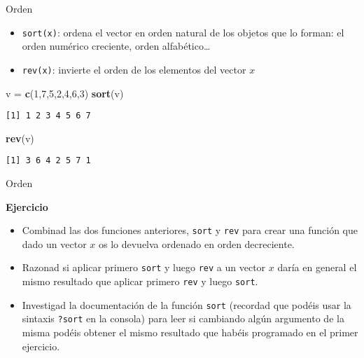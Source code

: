 \documentclass[
  ignorenonframetext,
]{beamer}
\newenvironment{Shaded}{\begin{snugshade}}{\end{snugshade}}
\newcommand{\DecValTok}[1]{\textcolor[rgb]{0.00,0.00,0.81}{#1}}
\newcommand{\KeywordTok}[1]{\textcolor[rgb]{0.13,0.29,0.53}{\textbf{#1}}}
\newcommand{\NormalTok}[1]{#1}
\newcommand{\StringTok}[1]{\textcolor[rgb]{0.31,0.60,0.02}{#1}}
\providecommand{\tightlist}{%
  \setlength{\itemsep}{0pt}\setlength{\parskip}{0pt}}
\begin{document}
\begin{frame}[fragile]{Orden}
\protect\hypertarget{orden}{}

\begin{itemize}
\tightlist
\item
  \texttt{sort(x)}: ordena el vector en orden natural de los objetos que
  lo forman: el orden numérico creciente, orden alfabético\ldots{}
\item
  \texttt{rev(x)}: invierte el orden de los elementos del vector \(x\)
\end{itemize}

\begin{Shaded}
\begin{Highlighting}[]
\NormalTok{v =}\StringTok{ }\KeywordTok{c}\NormalTok{(}\DecValTok{1}\NormalTok{,}\DecValTok{7}\NormalTok{,}\DecValTok{5}\NormalTok{,}\DecValTok{2}\NormalTok{,}\DecValTok{4}\NormalTok{,}\DecValTok{6}\NormalTok{,}\DecValTok{3}\NormalTok{)}
\KeywordTok{sort}\NormalTok{(v)}
\end{Highlighting}
\end{Shaded}

\begin{verbatim}
[1] 1 2 3 4 5 6 7
\end{verbatim}

\begin{Shaded}
\begin{Highlighting}[]
\KeywordTok{rev}\NormalTok{(v)}
\end{Highlighting}
\end{Shaded}

\begin{verbatim}
[1] 3 6 4 2 5 7 1
\end{verbatim}

\end{frame}

\begin{frame}[fragile]{Orden}
\protect\hypertarget{orden-1}{}

\textbf{Ejercicio}

\begin{itemize}
\item
  Combinad las dos funciones anteriores, \texttt{sort} y \texttt{rev}
  para crear una función que dado un vector \(x\) os lo devuelva
  ordenado en orden decreciente.
\item
  Razonad si aplicar primero \texttt{sort} y luego \texttt{rev} a un
  vector \(x\) daría en general el mismo resultado que aplicar primero
  \texttt{rev} y luego \texttt{sort}.
\item
  Investigad la documentación de la función \texttt{sort} (recordad que
  podéis usar la sintaxis \texttt{?sort} en la consola) para leer si
  cambiando algún argumento de la misma podéis obtener el mismo
  resultado que habéis programado en el primer ejercicio.
\end{itemize}

\end{frame}
\end{document}
